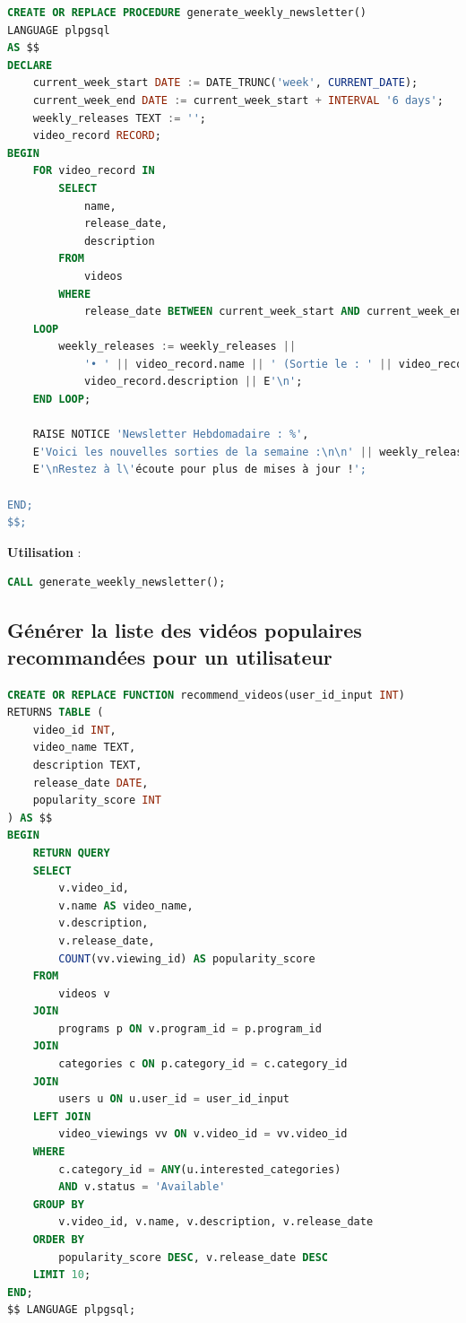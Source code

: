 \documentclass{article}
\begin{document}
\begin{lstlisting}[language=SQL]
CREATE OR REPLACE PROCEDURE generate_weekly_newsletter()
LANGUAGE plpgsql
AS $$
DECLARE
    current_week_start DATE := DATE_TRUNC('week', CURRENT_DATE);
    current_week_end DATE := current_week_start + INTERVAL '6 days';
    weekly_releases TEXT := '';
    video_record RECORD;
BEGIN
    FOR video_record IN 
        SELECT 
            name, 
            release_date, 
            description 
        FROM 
            videos 
        WHERE 
            release_date BETWEEN current_week_start AND current_week_end
    LOOP
        weekly_releases := weekly_releases || 
            '• ' || video_record.name || ' (Sortie le : ' || video_record.release_date || ') - ' || 
            video_record.description || E'\n';
    END LOOP;

    RAISE NOTICE 'Newsletter Hebdomadaire : %', 
    E'Voici les nouvelles sorties de la semaine :\n\n' || weekly_releases || 
    E'\nRestez à l\'écoute pour plus de mises à jour !';

END;
$$;
\end{lstlisting}

\textbf{Utilisation} :

\begin{lstlisting}[language=SQL]
CALL generate_weekly_newsletter();
\end{lstlisting}

\subsection{Générer la liste des vidéos populaires recommandées pour un utilisateur}

\begin{lstlisting}[language=SQL]
CREATE OR REPLACE FUNCTION recommend_videos(user_id_input INT)
RETURNS TABLE (
    video_id INT,
    video_name TEXT,
    description TEXT,
    release_date DATE,
    popularity_score INT
) AS $$
BEGIN
    RETURN QUERY
    SELECT 
        v.video_id,
        v.name AS video_name,
        v.description,
        v.release_date,
        COUNT(vv.viewing_id) AS popularity_score
    FROM 
        videos v
    JOIN 
        programs p ON v.program_id = p.program_id
    JOIN 
        categories c ON p.category_id = c.category_id
    JOIN 
        users u ON u.user_id = user_id_input
    LEFT JOIN 
        video_viewings vv ON v.video_id = vv.video_id
    WHERE 
        c.category_id = ANY(u.interested_categories)
        AND v.status = 'Available'
    GROUP BY 
        v.video_id, v.name, v.description, v.release_date
    ORDER BY 
        popularity_score DESC, v.release_date DESC
    LIMIT 10;
END;
$$ LANGUAGE plpgsql;
\end{lstlisting}
\end{document}
